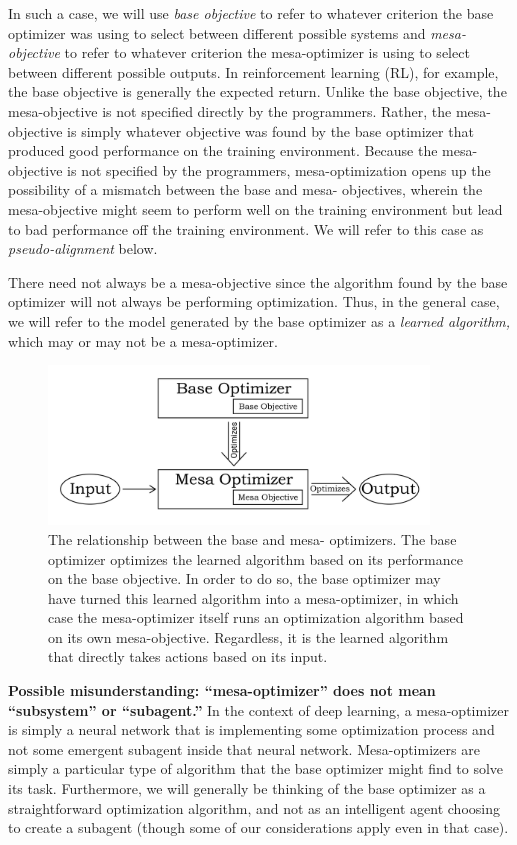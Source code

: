 \documentclass[
  onecolumn,
  natbib,
]{miri-tech-article}
\begin{document}
In such a case, we will use \textit{base objective} to refer to whatever criterion the base optimizer was using to select between different possible systems and \textit{mesa-objective} to refer to whatever criterion the mesa-optimizer is using to select between different possible outputs. In reinforcement learning (RL), for example, the base objective is generally the expected return. Unlike the base objective, the mesa-objective is not specified directly by the programmers. Rather, the mesa-objective is simply whatever objective was found by the base optimizer that produced good performance on the training environment. Because the mesa-objective is not specified by the programmers, mesa-optimization opens up the possibility of a mismatch between the base and mesa- objectives, wherein the mesa-objective might seem to perform well on the training environment but lead to bad performance off the training environment. We will refer to this case as \textit{pseudo-alignment} below.

There need not always be a mesa-objective since the algorithm found by the base optimizer will not always be performing optimization. Thus, in the general case, we will refer to the model generated by the base optimizer as a \textit{learned algorithm,} which may or may not be a mesa-optimizer.

\begin{figure}[h!]
  \centering
  \includegraphics[width=0.9\textwidth]{1_1.jpg}
  \caption{The relationship between the base and mesa- optimizers. The base optimizer optimizes the learned algorithm based on its performance on the base objective. In order to do so, the base optimizer may have turned this learned algorithm into a mesa-optimizer, in which case the mesa-optimizer itself runs an optimization algorithm based on its own mesa-objective. Regardless, it is the learned algorithm that directly takes actions based on its input.}
  \label{fig:1.1}
\end{figure}

\textbf{Possible misunderstanding: ``mesa-optimizer'' does not mean ``subsystem'' or ``subagent.''} In the context of deep learning, a mesa-optimizer is simply a neural network that is implementing some optimization process and not some emergent subagent inside that neural network. Mesa-optimizers are simply a particular type of algorithm that the base optimizer might find to solve its task. Furthermore, we will generally be thinking of the base optimizer as a straightforward optimization algorithm, and not as an intelligent agent choosing to create a subagent (though some of our considerations apply even in that case).
\end{document}
